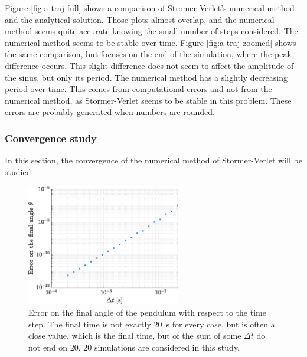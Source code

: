 \documentclass[a4paper,12pt,twoside]{article}
\begin{document}
Figure \ref{fig:a-traj-full} shows a comparison of Stromer-Verlet's numerical method and the analytical solution.
Those plots almost overlap, and the numerical method seems quite accurate knowing the small number of steps considered.
The numerical method seems to be stable over time.
Figure \ref{fig:a-traj-zoomed} shows the same comparison, but focuses on the end of the simulation, where the peak difference occurs.
This slight difference does not seem to affect the amplitude of the sinus, but only its period.
The numerical method has a slightly decreasing period over time.
This comes from computational errors and not from the numerical method, as Stormer-Verlet seems to be stable in this problem. 
These errors are probably generated when numbers are rounded.


\subsubsection{Convergence study}
In this section, the convergence of the numerical method of Stormer-Verlet will be studied.

\begin{figure}[h]
\centering
	\includegraphics[width=0.6\textwidth]{graphs/a_conv.eps}
	\caption{Error on the final angle of the pendulum with respect to the time step. The final time is not exactly \SI{20}{\s} for every case, but is often a close value, which is the final time, but of the sum of some $\Delta t$ do not end on \num{20}. \num{20} simulations are considered in this study.} %
	\label{fig:a-conv}
\end{figure}
\end{document}

